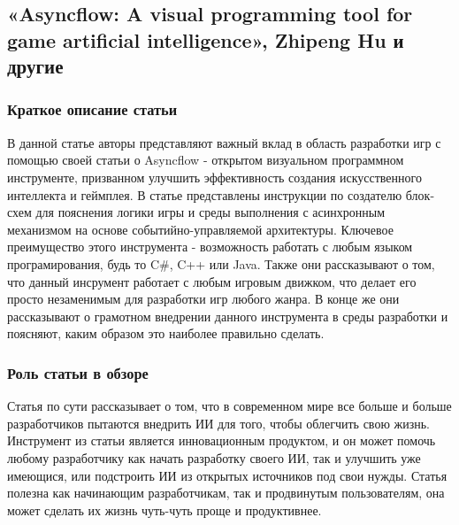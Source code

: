 \documentclass[14pt]{article}
\begin{document}
\subsection{«Asyncflow: A visual programming tool for game artificial intelligence», Zhipeng Hu и другие}
\subsubsection{Краткое описание статьи}
В данной статье авторы представляют важный вклад в область разработки игр с помощью своей статьи о Asyncflow - открытом визуальном программном инструменте, призванном улучшить эффективность создания искусственного интеллекта и геймплея. В статье представлены инструкции по создателю блок-схем для пояснения логики игры и среды выполнения с асинхронным механизмом на основе событийно-управляемой архитектуры. Ключевое преимущество этого инструмента - возможность работать с любым языком програмирования, будь то C#, C++ или Java. Также они рассказывают о том, что данный инсрумент работает с любым игровым движком, что делает его просто незаменимым для разработки игр любого жанра. В конце же они рассказывают о грамотном внедрении данного инструмента в среды разработки и поясняют, каким образом это наиболее правильно сделать.

\subsubsection{Роль статьи в обзоре}
Статья по сути рассказывает о том, что в современном мире все больше и больше разработчиков пытаются внедрить ИИ для того, чтобы облегчить свою жизнь. Инструмент из статьи является инновационным продуктом, и он может помочь любому разработчику как начать разработку своего ИИ, так и улучшить уже имеющися, или подстроить ИИ из открытых источников под свои нужды. Статья полезна как начинающим разработчикам, так и продвинутым пользователям, она может сделать их жизнь чуть-чуть проще и продуктивнее.


\newpage
\end{document}
